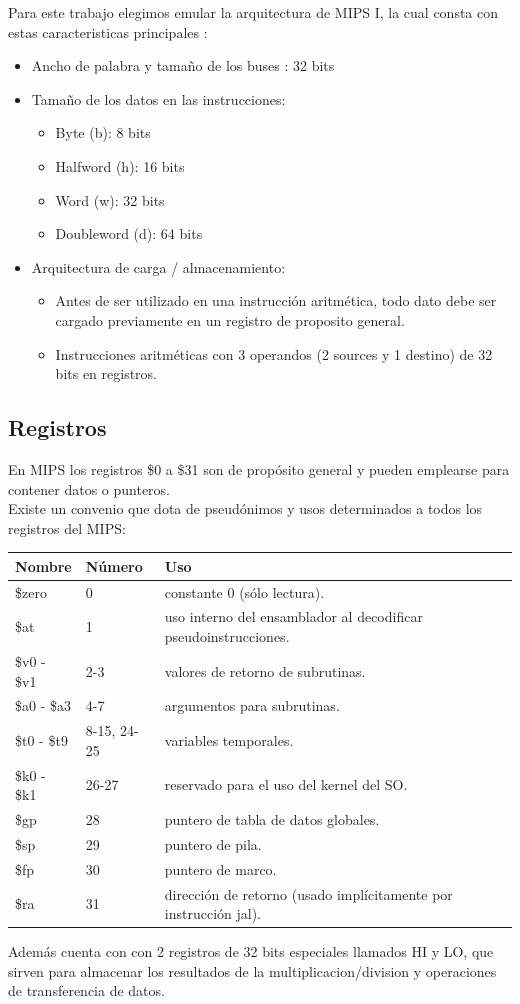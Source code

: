 \documentclass[12pt]{article}
\begin{document}
Para este trabajo elegimos emular  la arquitectura de MIPS I, la cual consta con estas caracteristicas  principales :
\begin{itemize}
\item Ancho de palabra y tamaño de los buses : 32 bits
\item  Tamaño de los datos en las instrucciones:
	\begin{itemize}
	\item Byte (b): 8 bits
	\item Halfword (h): 16 bits
	\item Word (w): 32 bits
	\item Doubleword (d): 64 bits
	\end{itemize}
 \item Arquitectura de carga / almacenamiento:
 	\begin{itemize}
 	\item Antes de ser utilizado en una instrucción aritmética, todo dato debe
 	ser cargado previamente en un registro de proposito general.
 	\item Instrucciones aritméticas con 3 operandos (2 sources y 1 destino) de 32 bits en registros.
 	\end{itemize} 
\end{itemize}
\subsection{Registros}
En MIPS los registros \$0 a \$31 son de propósito general y pueden emplearse
para contener datos o punteros.\\
Existe un convenio que dota de pseudónimos y usos determinados a todos los
registros del MIPS:

\begin{table}[H]
\centering
	\begin{tabular}{@{}lll@{}}
	\toprule
	\multicolumn{1}{c}{Nombre} & Número & Uso          \\ \midrule
	\$zero                & 0 & constante 0 (sólo lectura). \\
	\$at                  & 1 & uso interno del ensamblador al decodificar pseudoinstrucciones. \\
	\$v0 - \$v1       & 2-3 & valores de retorno de subrutinas. \\
	\$a0 - \$a3      & 4-7 & argumentos para subrutinas. \\
	\$t0 - \$t9      & 8-15, 24-25 & variables temporales. \\   
	\$k0 - \$k1     & 26-27 & reservado para el uso del kernel del SO.\\   
	\$gp                 & 28 & puntero de tabla de datos globales.\\
	\$sp                & 29 & puntero de pila.\\
	\$fp                 & 30 & puntero de marco. \\
	\$ra                 & 31 & dirección de retorno (usado implícitamente por instrucción jal).
	\end{tabular}%
\end{table}
Además cuenta con con 2 registros de 32 bits especiales  llamados HI y LO, que sirven
para almacenar los resultados de la multiplicacion/division y operaciones de transferencia de datos.
\end{document}

